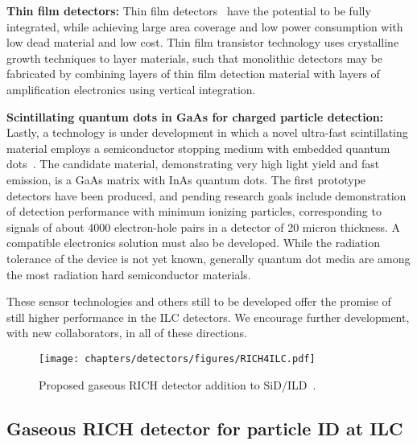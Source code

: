 {\bf Thin film detectors:}
Thin film detectors~\cite{Metcalfe:2014nma} have the potential to be fully integrated, while achieving large area coverage and low power consumption with low dead material and low cost. Thin film transistor technology uses crystalline growth techniques to layer materials, such that monolithic detectors may be fabricated by combining layers of thin film detection material with layers of amplification electronics using vertical integration.


{\bf Scintillating quantum dots in GaAs for charged particle detection:}   Lastly, a technology is under development in which a novel ultra-fast scintillating material employs a semiconductor stopping medium with embedded quantum dots~\cite{Oktyabrsky:2016ard}. The candidate material, demonstrating very high light yield and fast emission, is a GaAs matrix with InAs quantum dots. The first prototype detectors have been produced, and pending research goals include demonstration of detection performance with minimum ionizing particles, corresponding to signals of about 4000 electron-hole pairs in a detector of 20 micron thickness. A compatible electronics solution must also be developed. While the radiation tolerance of the device is not yet known, generally quantum dot media are among the most radiation hard semiconductor materials.

These sensor technologies and others still to be developed offer the promise of still
higher performance in the ILC detectors.  We encourage further development, with 
new collaborators, in all of these directions.


\begin{figure}
\centering
\texttt{[image: chapters/detectors/figures/RICH4ILC.pdf]}
\caption{Proposed gaseous RICH detector addition to SiD/ILD~\cite{CairoVavra}.}
\label{fig:RICH} 
\end{figure}



\subsection{Gaseous RICH detector for particle ID at ILC}
\label{sec:RICH4ILC}

